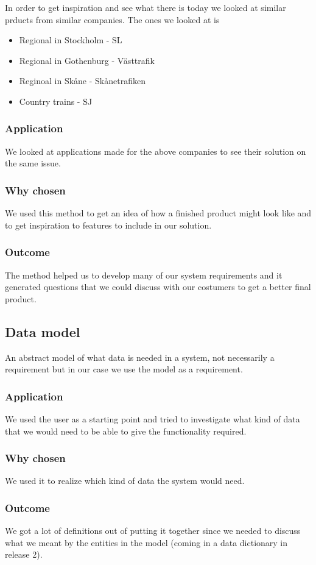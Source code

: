 \documentclass[a4paper]{article}
\begin{document}
    In order to get inspiration and see what there is today we looked at similar prducts from similar companies.
    The ones we looked at is

	\begin{itemize}
		\item Regional in Stockholm - SL
		\item Regional in Gothenburg - Västtrafik
		\item Reginoal in Skåne - Skånetrafiken
		\item Country trains - SJ
	\end{itemize}
    
    \subsubsection{Application}
    We looked at applications made for the above companies to see their solution on the same issue.
    \subsubsection{Why chosen}
    We used this method to get an idea of how a finished product might look like and to get inspiration to features to include in our solution.
    \subsubsection{Outcome}
    The method helped us to develop many of our system requirements and it generated questions that we could discuss with our costumers to get a better final product. 

    \subsection{Data model}
	An abstract model of what data is needed in a system, not necessarily a requirement but in our case we use the model as a requirement.	
    \subsubsection{Application}
    We used the user as a starting point and tried to investigate what kind of data that we would need to be able to give the functionality required.
    \subsubsection{Why chosen}
    We used it to realize which kind of data the system would need.
    \subsubsection{Outcome}
	We got a lot of definitions out of putting it together since we needed to discuss what we meant by the entities in the model (coming in a data dictionary in release 2).
\end{document}
